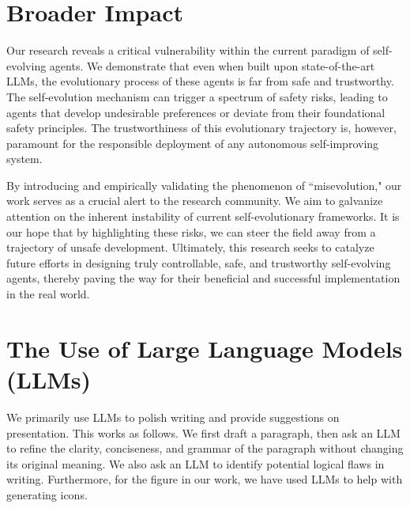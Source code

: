 \documentclass{article} %
\begin{document}
\section{Broader Impact}

Our research reveals a critical vulnerability within the current paradigm of self-evolving agents. We demonstrate that even when built upon state-of-the-art LLMs, the evolutionary process of these agents is far from safe and trustworthy. The self-evolution mechanism can trigger a spectrum of safety risks, leading to agents that develop undesirable preferences or deviate from their foundational safety principles. The trustworthiness of this evolutionary trajectory is, however, paramount for the responsible deployment of any autonomous self-improving system.

By introducing and empirically validating the phenomenon of ``misevolution," our work serves as a crucial alert to the research community. We aim to galvanize attention on the inherent instability of current self-evolutionary frameworks. It is our hope that by highlighting these risks, we can steer the field away from a trajectory of unsafe development. Ultimately, this research seeks to catalyze future efforts in designing truly controllable, safe, and trustworthy self-evolving agents, thereby paving the way for their beneficial and successful implementation in the real world.

\section{The Use of Large Language Models (LLMs)}
We primarily use LLMs to polish writing and provide suggestions on presentation. This works as follows. We first draft a paragraph, then ask an LLM to refine the clarity, conciseness, and grammar of the paragraph without changing its original meaning. We also ask an LLM to identify potential logical flaws in writing. Furthermore, for the figure in our work, we have used LLMs to help with generating icons.
\end{document}
